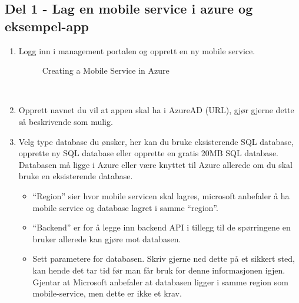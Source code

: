 \subsection{Del 1 - Lag en mobile service i azure og eksempel-app}
\label{subsec:veiledninger_androidBrukerveliedning_del1-LagEnMobileServiceIAzureogEksempel-app}
\begin{enumerate}
\item Logg inn i management portalen og opprett en ny mobile service.
\\
\begin{figure}[H]
    \centering
    \setlength{\fboxsep}{0pt}%
    \setlength{\fboxrule}{1pt}%
    \caption{Creating a Mobile Service in Azure}
\end{figure}

\\
\item Opprett navnet du vil at appen skal ha i AzureAD (URL), gjør gjerne dette så beskrivende som mulig.
\\
\item Velg type database du ønsker, her kan du bruke eksisterende SQL database, opprette ny SQL database eller opprette en gratis 20MB SQL database. Databasen må ligge i Azure eller være knyttet til Azure allerede om du skal bruke en eksisterende database.
\\
\begin{itemize}
\item “Region” sier hvor mobile servicen skal lagres, microsoft anbefaler å ha mobile service og database lagret i samme “region”.
\item “Backend” er for å legge inn backend API i tillegg til de spørringene en bruker allerede kan gjøre mot databasen.
\item Sett parametere for databasen. Skriv gjerne ned dette på et sikkert sted, kan hende det tar tid før man får bruk for denne informasjonen igjen. Gjentar at Microsoft anbefaler at databasen ligger i samme region som mobile-service, men dette er ikke et krav.
\end{itemize}
\bigskip


\end{enumerate}
